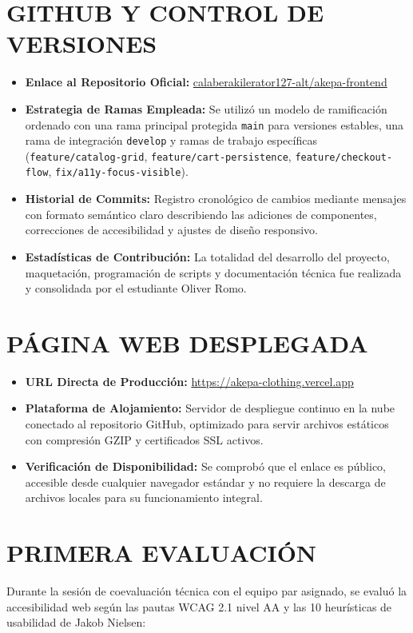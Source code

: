 \documentclass[12pt]{article}
\begin{document}
\section*{GITHUB Y CONTROL DE VERSIONES}
\begin{itemize}
    \item \textbf{Enlace al Repositorio Oficial:} \href{https://github.com/calaberakilerator127-alt/akepa-frontend}{calaberakilerator127-alt/akepa-frontend}
    \item \textbf{Estrategia de Ramas Empleada:} Se utilizó un modelo de ramificación ordenado con una rama principal protegida \texttt{main} para versiones estables, una rama de integración \texttt{develop} y ramas de trabajo específicas (\texttt{feature/catalog-grid}, \texttt{feature/cart-persistence}, \texttt{feature/checkout-flow}, \texttt{fix/a11y-focus-visible}).
    \item \textbf{Historial de Commits:} Registro cronológico de cambios mediante mensajes con formato semántico claro describiendo las adiciones de componentes, correcciones de accesibilidad y ajustes de diseño responsivo.
    \item \textbf{Estadísticas de Contribución:} La totalidad del desarrollo del proyecto, maquetación, programación de scripts y documentación técnica fue realizada y consolidada por el estudiante Oliver Romo.
\end{itemize}

\section*{PÁGINA WEB DESPLEGADA}
\begin{itemize}
    \item \textbf{URL Directa de Producción:} \url{https://akepa-clothing.vercel.app}
    \item \textbf{Plataforma de Alojamiento:} Servidor de despliegue continuo en la nube conectado al repositorio GitHub, optimizado para servir archivos estáticos con compresión GZIP y certificados SSL activos.
    \item \textbf{Verificación de Disponibilidad:} Se comprobó que el enlace es público, accesible desde cualquier navegador estándar y no requiere la descarga de archivos locales para su funcionamiento integral.
\end{itemize}

\section*{PRIMERA EVALUACIÓN}
Durante la sesión de coevaluación técnica con el equipo par asignado, se evaluó la accesibilidad web según las pautas WCAG 2.1 nivel AA y las 10 heurísticas de usabilidad de Jakob Nielsen:
\end{document}
